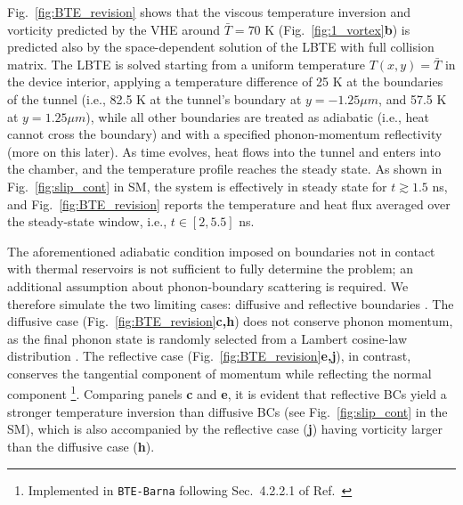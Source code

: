 \documentclass[
prb,
twocolumn,
superscriptaddress,
 amsmath,amssymb,
 aps,
longbibliography,
]{revtex4-2}
\begin{document}
Fig.~\ref{fig:BTE_revision} shows that the viscous temperature inversion and vorticity predicted by the VHE around $\bar{T}=70 $ K (Fig.~\ref{fig:1_vortex}\textbf{b}) is predicted also by the space-dependent solution of the LBTE with full collision matrix.
The LBTE is solved starting from a uniform temperature $T(x,y)=\bar{T}$ in the device interior, applying a temperature difference of 25 K at the boundaries of the tunnel (i.e., 82.5 K at the tunnel’s boundary
at $y = {-}1.25 \mu m$, and 57.5 K at $y = 1.25 \mu m$), while all other boundaries are treated as adiabatic (i.e., heat cannot cross the boundary) and with a specified phonon-momentum reflectivity (more on this later). As time evolves, heat flows into the tunnel and enters into the chamber, and the temperature profile reaches the steady state.
As shown in Fig.~\ref{fig:slip_cont} in SM, the system is effectively in steady state for $t\gtrsim 1.5$ ns, and Fig.~\ref{fig:BTE_revision} reports the temperature and heat flux averaged over the steady-state window, i.e., $t\in[2,5.5]$ ns.


The aforementioned adiabatic condition imposed on boundaries not in contact with thermal reservoirs is not sufficient to fully determine the problem; an additional assumption about phonon-boundary scattering is required.
We therefore simulate the two limiting cases: diffusive and reflective boundaries \cite{raya-moreno_heat_nodate,raya-moreno_hydrodynamic_2022}.
The diffusive case (Fig.~\ref{fig:BTE_revision}\textbf{c,h}) does not conserve phonon momentum, as the final phonon state is randomly selected from a Lambert cosine-law distribution \cite{sabattiSimulationPhononTransport2016a,raya-moreno_hydrodynamic_2022}.
The reflective case (Fig.~\ref{fig:BTE_revision}\textbf{e,j}), in contrast, conserves the tangential component of momentum while reflecting the normal component \footnote{Implemented in \texttt{BTE-Barna} following Sec.~4.2.2.1 of Ref.~\cite{raya-moreno_heat_nodate}}.
Comparing panels \textbf{c} and \textbf{e}, it is evident that reflective BCs yield a stronger temperature inversion than diffusive BCs (see Fig.~\ref{fig:slip_cont} in the SM), which is also accompanied by the reflective case (\textbf{j}) having vorticity larger than the diffusive case (\textbf{h}).
\end{document}
